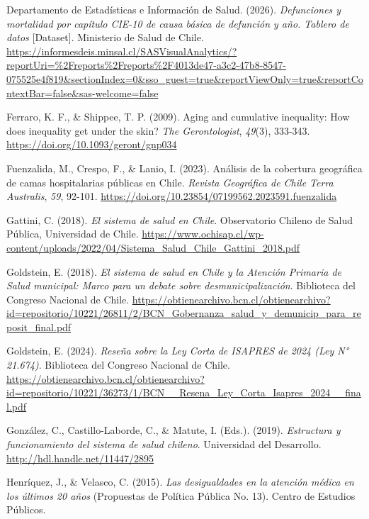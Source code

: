 \documentclass[
  spanish,
  a4paper,
  oneside]{scrbook}
\newlength{\cslhangindent}
\newenvironment{CSLReferences}[2] %
 {\begin{list}{}{%
  \setlength{\itemindent}{0pt}
  \setlength{\leftmargin}{0pt}
  \setlength{\parsep}{0pt}
  \ifodd #1
   \setlength{\leftmargin}{\cslhangindent}
   \setlength{\itemindent}{-1\cslhangindent}
  \fi
  \setlength{\itemsep}{#2\baselineskip}}}
 {\end{list}}
\begin{document}
\begin{CSLReferences}{1}{0}
Departamento de Estadísticas e Información de Salud. (2026).
\emph{Defunciones y mortalidad por capítulo {CIE-10} de causa básica de
defunción y año. Tablero de datos} {[}Dataset{]}. Ministerio de Salud de
Chile.
\url{https://informesdeis.minsal.cl/SASVisualAnalytics/?reportUri=\%2Freports\%2Freports\%2F4013de47-a3c2-47b8-8547-075525e4f819&sectionIndex=0&sso_guest=true&reportViewOnly=true&reportContextBar=false&sas-welcome=false}

Ferraro, K. F., \& Shippee, T. P. (2009). Aging and cumulative
inequality: {How} does inequality get under the skin? \emph{The
Gerontologist}, \emph{49}(3), 333-343.
\url{https://doi.org/10.1093/geront/gnp034}

Fuenzalida, M., Crespo, F., \& Lanio, I. (2023). Análisis de la
cobertura geográfica de camas hospitalarias públicas en Chile.
\emph{Revista Geográfica de Chile Terra Australis}, \emph{59}, 92-101.
\url{https://doi.org/10.23854/07199562.2023591.fuenzalida}

Gattini, C. (2018). \emph{El sistema de salud en Chile}. Observatorio
Chileno de Salud Pública, Universidad de Chile.
\url{https://www.ochisap.cl/wp-content/uploads/2022/04/Sistema_Salud_Chile_Gattini_2018.pdf}

Goldstein, E. (2018). \emph{El sistema de salud en Chile y la Atención
Primaria de Salud municipal: Marco para un debate sobre
desmunicipalización}. Biblioteca del Congreso Nacional de Chile.
\url{https://obtienearchivo.bcn.cl/obtienearchivo?id=repositorio/10221/26811/2/BCN_Gobernanza_salud_y_demunicip_para_reposit_final.pdf}

Goldstein, E. (2024). \emph{Reseña sobre la Ley Corta de ISAPRES de 2024
(Ley N° 21.674)}. Biblioteca del Congreso Nacional de Chile.
\url{https://obtienearchivo.bcn.cl/obtienearchivo?id=repositorio/10221/36273/1/BCN__Resena_Ley_Corta_Isapres_2024__final.pdf}

González, C., Castillo-Laborde, C., \& Matute, I. (Eds.). (2019).
\emph{Estructura y funcionamiento del sistema de salud chileno}.
Universidad del Desarrollo. \url{http://hdl.handle.net/11447/2895}

Henríquez, J., \& Velasco, C. (2015). \emph{Las desigualdades en la
atención médica en los últimos 20 años} (Propuestas de Política Pública
No. 13). Centro de Estudios Públicos.


\end{CSLReferences}
\end{document}
